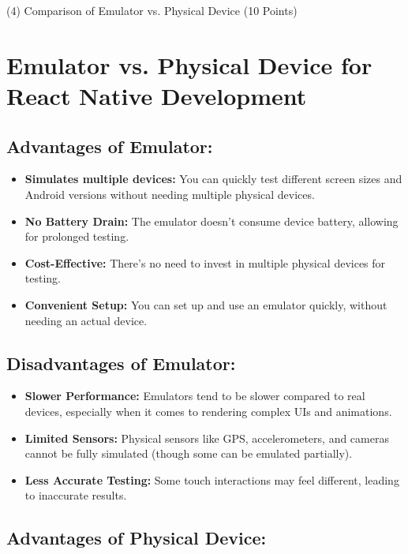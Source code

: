 \documentclass{article}
\begin{document}
(4) Comparison of Emulator vs. Physical Device (10 Points)\\

\section*{Emulator vs. Physical Device for React Native Development}

\subsection*{Advantages of Emulator:}

\begin{itemize}
    \item \textbf{Simulates multiple devices:} You can quickly test different screen sizes and Android versions without needing multiple physical devices.
    \item \textbf{No Battery Drain:} The emulator doesn't consume device battery, allowing for prolonged testing.
    \item \textbf{Cost-Effective:} There’s no need to invest in multiple physical devices for testing.
    \item \textbf{Convenient Setup:} You can set up and use an emulator quickly, without needing an actual device.
\end{itemize}

\subsection*{Disadvantages of Emulator:}

\begin{itemize}
    \item \textbf{Slower Performance:} Emulators tend to be slower compared to real devices, especially when it comes to rendering complex UIs and animations.
    \item \textbf{Limited Sensors:} Physical sensors like GPS, accelerometers, and cameras cannot be fully simulated (though some can be emulated partially).
    \item \textbf{Less Accurate Testing:} Some touch interactions may feel different, leading to inaccurate results.
\end{itemize}

\subsection*{Advantages of Physical Device:}
\end{document}
